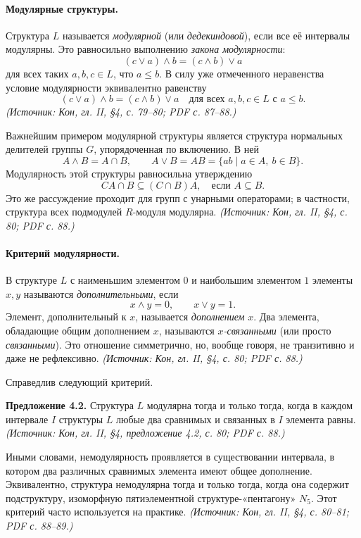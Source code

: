\documentclass[a4paper,12pt]{article}
\begin{document}
\paragraph{Модулярные структуры.}
Структура \(L\) называется \emph{модулярной} (или \emph{дедекиндовой}), если все её интервалы модулярны. Это равносильно выполнению \emph{закона модулярности}:
\[
(c\vee a)\wedge b=(c\wedge b)\vee a
\]
для всех таких \(a,b,c\in L\), что \(a\le b\). В силу уже отмеченного неравенства условие модулярности эквивалентно равенству
\[
(c\vee a)\wedge b=(c\wedge b)\vee a
\quad\text{для всех }a,b,c\in L\text{ с }a\le b.
\]
\textit{(Источник: Кон, гл. II, §4, с. 79--80; PDF с. 87--88.)}

Важнейшим примером модулярной структуры является структура нормальных делителей группы \(G\), упорядоченная по включению. В ней
\[
A\wedge B=A\cap B,\qquad
A\vee B=AB=\{ab\mid a\in A,\ b\in B\}.
\]
Модулярность этой структуры равносильна утверждению
\[
CA\cap B\subseteq (C\cap B)A,\quad\text{если }A\subseteq B.
\]
Это же рассуждение проходит для групп с унарными операторами; в частности, структура всех подмодулей \(R\)-модуля модулярна.
\textit{(Источник: Кон, гл. II, §4, с. 80; PDF с. 88.)}

\paragraph{Критерий модулярности.}
В структуре \(L\) с наименьшим элементом \(0\) и наибольшим элементом \(1\) элементы \(x,y\) называются \emph{дополнительными}, если
\[
x\wedge y=0,\qquad x\vee y=1.
\]
Элемент, дополнительный к \(x\), называется \emph{дополнением} \(x\). Два элемента, обладающие общим дополнением \(x\), называются \emph{\(x\)-связанными} (или просто \emph{связанными}). Это отношение симметрично, но, вообще говоря, не транзитивно и даже не рефлексивно.
\textit{(Источник: Кон, гл. II, §4, с. 80; PDF с. 88.)}

Справедлив следующий критерий.

\textbf{Предложение 4.2.} Структура \(L\) модулярна тогда и только тогда, когда в каждом интервале \(I\) структуры \(L\) любые два сравнимых и связанных в \(I\) элемента равны.
\textit{(Источник: Кон, гл. II, §4, предложение 4.2, с. 80; PDF с. 88.)}

Иными словами, немодулярность проявляется в существовании интервала, в котором два различных сравнимых элемента имеют общее дополнение. Эквивалентно, структура немодулярна тогда и только тогда, когда она содержит подструктуру, изоморфную пятиэлементной структуре-«пентагону» \(N_5\). Этот критерий часто используется на практике.
\textit{(Источник: Кон, гл. II, §4, с. 80--81; PDF с. 88--89.)}
\end{document}
